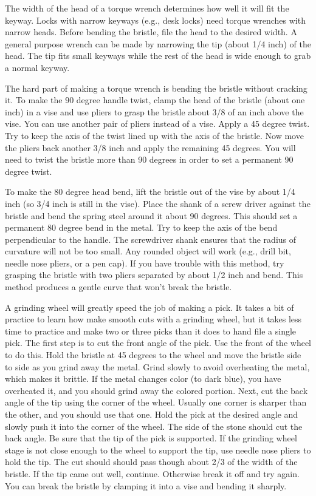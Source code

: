 The width of the head of a torque wrench determines how well it will fit the keyway. 
Locks with narrow keyways (e.g., desk locks) need torque wrenches with narrow heads. 
Before bending the bristle, file the head to the desired width. A general purpose wrench can 
be made by narrowing the tip (about 1/4 inch) of the head. The tip fits small keyways while 
the rest of the head is wide enough to grab a normal keyway. 

The hard part of making a torque wrench is bending the bristle without cracking it. To 
make the 90 degree handle twist, clamp the head of the bristle (about one inch) in a vise 
and use pliers to grasp the bristle about 3/8 of an inch above the vise. You can use another 
pair of pliers instead of a vise. Apply a 45 degree twist. Try to keep the axis of the twist 
lined up with the axis of the bristle. Now move the pliers back another 3/8 inch and apply 
the remaining 45 degrees. You will need to twist the bristle more than 90 degrees in order 
to set a permanent 90 degree twist. 

To make the 80 degree head bend, lift the bristle out of the vise by about 1/4 inch (so 
3/4 inch is still in the vise). Place the shank of a screw driver against the bristle and bend 
the spring steel around it about 90 degrees. This should set a permanent 80 degree bend in 
the metal. Try to keep the axis of the bend perpendicular to the handle. The screwdriver 
shank ensures that the radius of curvature will not be too small. Any rounded object will 
work (e.g., drill bit, needle nose pliers, or a pen cap). If you have trouble with this method, 
try grasping the bristle with two pliers separated by about 1/2 inch and bend. This method 
produces a gentle curve that won't break the bristle. 

A grinding wheel will greatly speed the job of making a pick. It takes a bit of practice 
to learn how make smooth cuts with a grinding wheel, but it takes less time to practice and 
make two or three picks than it does to hand file a single pick. The first step is to cut the 
front angle of the pick. Use the front of the wheel to do this. Hold the bristle at 45 degrees 
to the wheel and move the bristle side to side as you grind away the metal. Grind slowly 
to avoid overheating the metal, which makes it brittle. If the metal changes color (to dark 
blue), you have overheated it, and you should grind away the colored portion. Next, cut 
the back angle of the tip using the corner of the wheel. Usually one corner is sharper than 
the other, and you should use that one. Hold the pick at the desired angle and slowly push 
it into the corner of the wheel. The side of the stone should cut the back angle. Be sure 
that the tip of the pick is supported. If the grinding wheel stage is not close enough to the 
wheel to support the tip, use needle nose pliers to hold the tip. The cut should should pass 
though about 2/3 of the width of the bristle. If the tip came out well, continue. Otherwise 
break it off and try again. You can break the bristle by clamping it into a vise and bending 
it sharply. 


